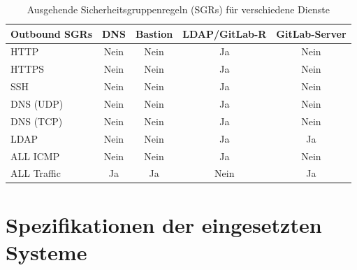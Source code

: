 \documentclass[a4paper,12pt]{article}
\begin{document}
\begin{table}[h!]
	\centering
	\begin{tabular}{|l|c|c|c|c|}
		\hline
		\textbf{Outbound SGRs} & \textbf{DNS} & \textbf{Bastion} & \textbf{LDAP/GitLab-R} & \textbf{GitLab-Server} \\ \hline
		HTTP                   & Nein         & Nein             & Ja                     & Nein                   \\ \hline
		HTTPS                  & Nein         & Nein             & Ja                     & Nein                   \\ \hline
		SSH                    & Nein         & Nein             & Ja                     & Nein                   \\ \hline
		DNS (UDP)              & Nein         & Nein             & Ja                     & Nein                   \\ \hline
		DNS (TCP)              & Nein         & Nein             & Ja                     & Nein                   \\ \hline
		LDAP                   & Nein         & Nein             & Ja                     & Ja                     \\ \hline
		ALL ICMP               & Nein         & Nein             & Ja                     & Nein                   \\ \hline
		ALL Traffic            & Ja           & Ja               & Nein                   & Ja                     \\ \hline
	\end{tabular}
	\caption{Ausgehende Sicherheitsgruppenregeln (SGRs) für verschiedene Dienste}
	\label{tab:outbound-sgrs}
\end{table}


\newpage
\section{Spezifikationen der eingesetzten Systeme}
\end{document}
